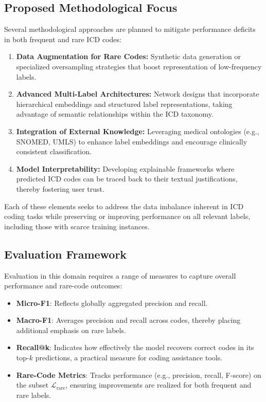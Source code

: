 \subsection{Proposed Methodological Focus}
\label{sec:p1:methodfocus}
Several methodological approaches are planned to mitigate performance deficits in both frequent and rare ICD codes:

\begin{enumerate}
    \item \textbf{Data Augmentation for Rare Codes:} Synthetic data generation or specialized oversampling strategies that boost representation of low-frequency labels.
    \item \textbf{Advanced Multi-Label Architectures:} Network designs that incorporate hierarchical embeddings and structured label representations, taking advantage of semantic relationships within the ICD taxonomy.
    \item \textbf{Integration of External Knowledge:} Leveraging medical ontologies (e.g., SNOMED, UMLS) to enhance label embeddings and encourage clinically consistent classification.
    \item \textbf{Model Interpretability:} Developing explainable frameworks where predicted ICD codes can be traced back to their textual justifications, thereby fostering user trust.
\end{enumerate}

Each of these elements seeks to address the data imbalance inherent in ICD coding tasks while preserving or improving performance on all relevant labels, including those with scarce training instances.

\subsection{Evaluation Framework}
\label{sec:p1:evalframework}
Evaluation in this domain requires a range of measures to capture overall performance and rare-code outcomes:

\begin{itemize}
    \item \textbf{Micro-F1}: Reflects globally aggregated precision and recall. 
    \item \textbf{Macro-F1}: Averages precision and recall across codes, thereby placing additional emphasis on rare labels.
    \item \textbf{Recall@k}: Indicates how effectively the model recovers correct codes in its top-\(k\) predictions, a practical measure for coding assistance tools.
    \item \textbf{Rare-Code Metrics}: Tracks performance (e.g., precision, recall, F-score) on the subset \(\mathcal{L}_{\mathrm{rare}}\), ensuring improvements are realized for both frequent and rare labels.
\end{itemize}

